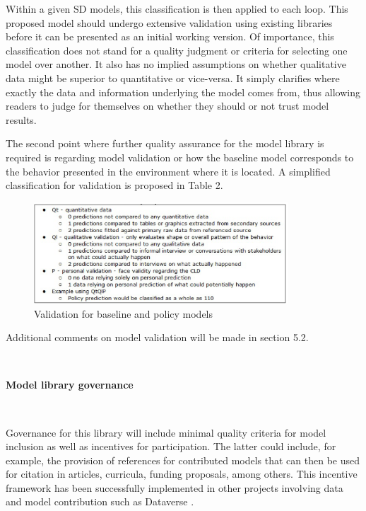 \documentclass[11pt]{article}
\begin{document}
Within a given SD models, this classification is then applied to each loop. This proposed model should undergo extensive validation using existing libraries before it can be presented as an initial working version.  Of importance, this classification does not stand for a quality judgment or criteria for selecting one model over another.  It also has no implied assumptions on whether qualitative data might be superior to quantitative or vice-versa.  It simply clarifies where exactly the data and information underlying the model comes from, thus allowing readers to judge for themselves on whether they should or not trust model results. 

The second point where further quality assurance for the model library is required is regarding model validation or how the baseline model corresponds to the behavior presented in the environment where it is located.  A simplified classification for validation is proposed in Table 2. 

\begin{figure}[htbp]
	\centering
		\includegraphics[width=0.85\textwidth]{quadro2.ps}
	\caption{Validation for baseline and policy models }
	\label{fig:quadro2}
\end{figure}

Additional comments on model validation will be made in section 5.2.

\

\noindent \textbf{Model library governance}

\

Governance for this library will include minimal quality criteria for model inclusion as well as incentives for participation.  The latter could include, for example, the provision of references for contributed models that can then be used for citation in articles, curricula, funding proposals, among others.  This incentive framework has been successfully implemented in other projects involving data and model contribution such as Dataverse \cite{thedata}.
\end{document}
